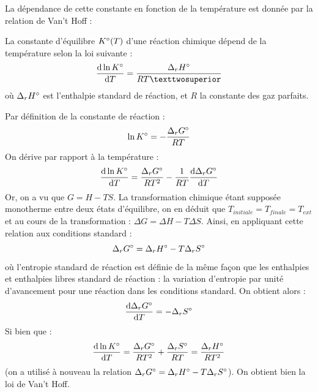 \documentclass[11pt,fleqn]{book} %
\newcommand{\dd}{\mathrm{d}}
\begin{document}
La dépendance de cette constante en fonction de la température est donnée par la relation de Van't Hoff :
\begin{theorem}
    La constante d'équilibre $K\degree(T)$ d'une réaction chimique dépend de la température selon la loi suivante :
    \begin{equation}
        \frac{\dd \ln K\degree}{\dd T} = \frac{\Delta_r H\degree}{R T²}
    \end{equation}
    où $\Delta_r H\degree$ est l'enthalpie standard de réaction, et $R$ la constante des gaz parfaits. 
\end{theorem}
\begin{demonstration}
    Par définition de la constante de réaction :
    \begin{equation}
        \ln K\degree  = - \frac{\Delta_r G\degree}{RT}
    \end{equation}
    On dérive par rapport à la température :
    \begin{equation}
        \frac{\dd \ln K\degree}{\dd T} = \frac{\Delta_r G\degree}{RT^2} - \frac{1}{RT} \frac{\dd \Delta_r G\degree}{\dd T}
    \end{equation}
    Or, on a vu que $G = H - TS$. La transformation chimique étant supposée monotherme entre deux états d'équilibre, on en déduit que $T_{initiale} = T_{finale} = T_{ext}$ et au cours de la transformation : $\Delta G = \Delta H - T \Delta S$. Ainsi, en appliquant cette relation aux conditions standard :
    \begin{equation}
        \Delta_r G\degree = \Delta_r H\degree - T \Delta_r S\degree
    \end{equation}
    où l'entropie standard de réaction est définie de la même façon que les enthalpies et enthalpies libres standard de réaction : la variation d'entropie par unité d'avancement pour une réaction dans les conditions standard. On obtient alors :
    \begin{equation}
        \frac{\dd \Delta_r G\degree}{\dd T} = - \Delta_r S\degree
    \end{equation}
    Si bien que :
    \begin{equation}
    \frac{\dd \ln K\degree}{\dd T} = \frac{\Delta_r G\degree}{RT^2} + \frac{\Delta_r S\degree}{RT} = \frac{\Delta_r H\degree}{R T^2}
    \end{equation}
    (on a utilisé à nouveau la relation $\Delta_rG\degree = \Delta_rH\degree-T\Delta_rS\degree$). On obtient bien la loi de Van't Hoff.
\end{demonstration}
\end{document}
